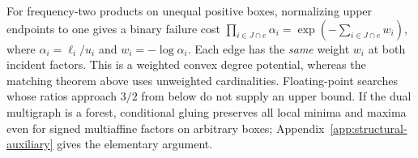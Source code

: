 For frequency-two products on unequal positive boxes, normalizing upper
endpoints to one gives a binary failure cost
$\prod_{i\in J\cap e}\alpha_i=\exp(-\sum_{i\in J\cap e}w_i)$,
where $\alpha_i=\ell_i/u_i$ and $w_i=-\log\alpha_i$. Each edge has
the \emph{same} weight $w_i$ at both incident factors. This is a weighted
convex degree potential, whereas the matching theorem above uses
unweighted cardinalities. Floating-point searches whose ratios approach
$3/2$ from below do not supply an upper bound. If the dual multigraph
is a forest, conditional gluing preserves all local minima
and maxima even for signed multiaffine factors on arbitrary boxes;
Appendix~\ref{app:structural-auxiliary} gives the elementary argument.
